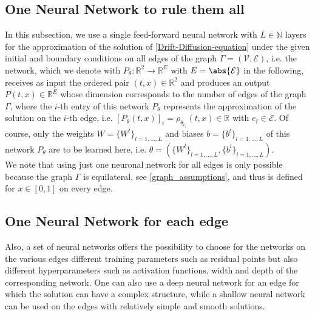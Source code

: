 
\subsection{One Neural Network to rule them all}
\label{ch3:sec1:subsec1}

In this subsection, we use a single feed-forward neural network with $L \in \mathbb{N}$ layers for the approximation of the solution of \cref{Drift-Diffusion-equation} under the given initial and boundary conditions on all edges of the graph $\Gamma = (\mathcal{V}, \mathcal{E})$, i.e. the network, which we denote with $P_{\theta} \colon \mathbb{R}^2 \to \mathbb{R}^{E}$ with $E = \abs{\mathcal{E}}$ in the following, receives as input the ordered pair $(t,x) \in \mathbb{R}^2$ and produces an output $P(t,x) \in \mathbb{R}^{E}$ whose dimension corresponds to the number of edges of the graph $\Gamma$, where the $i$-th entry of this network $P_{\theta}$ represents the approximation of the solution on the $i$-th edge, i.e. $[P_{\theta}(t,x)]_i = \rho_{\theta_{e_i}} \left( t,x \right) \in \mathbb{R}$ with $e_i \in \mathcal{E}$. Of course, only the weights $W = \{ W^l \}_{l = 1, \ldots, L}$ and biases $b = \{ b^l \}_{l = 1, \ldots, L}$ of this network $P_{\theta}$ are to be learned here, i.e. $\theta = (\{ W^l \}_{l = 1, \ldots, L}, \{ b^l \}_{l = 1, \ldots, L})$. \\
We note that using just one neuronal network for all edges is only possible because the graph $\Gamma$ is equilateral, see \cref{graph_assumptions}, and thus  is defined for $x \in [0,1]$ on every edge. %


\subsection{One Neural Network for each edge}
\label{ch3:sec1:subsec2}

Also, a set of neural networks offers the possibility to choose for the networks on the various edges different training parameters such as residual points but also different hyperparameters such as activation functions, width and depth of the corresponding network. One can also use a deep neural network for an edge for which the solution can have a complex structure, while a shallow neural network can be used on the edges with relatively simple and smooth solutions.






